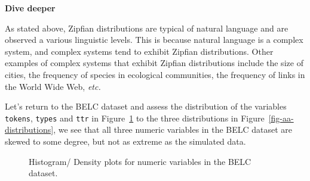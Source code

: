 \documentclass[
  letterpaper,
  DIV=11,
  numbers=noendperiod]{scrreprt}
\theoremstyle{definition}
\theoremstyle{remark}
\begin{document}
\begin{tcolorbox}[enhanced jigsaw, leftrule=.75mm, colframe=quarto-callout-color-frame, colback=white, rightrule=.15mm, opacityback=0, arc=.35mm, breakable, bottomrule=.15mm, left=2mm, toprule=.15mm]

\textbf{ Dive deeper}

As stated above, Zipfian distributions are typical of natural language
and are observed a various linguistic levels. This is because natural
language is a complex system, and complex systems tend to exhibit
Zipfian distributions. Other examples of complex systems that exhibit
Zipfian distributions include the size of cities, the frequency of
species in ecological communities, the frequency of links in the World
Wide Web, \emph{etc.}

\end{tcolorbox}

Let's return to the BELC dataset and assess the distribution of the
variables \texttt{tokens}, \texttt{types} and \texttt{ttr} in
Figure~\ref{fig-aa-belc-histogram-density-trimmed} to the three
distributions in Figure~\ref{fig-aa-distributions}, we see that all
three numeric variables in the BELC dataset are skewed to some degree,
but not as extreme as the simulated data.

\begin{figure}[H]

\begin{minipage}{0.33\linewidth}



\end{minipage}%
%
\begin{minipage}{0.33\linewidth}



\end{minipage}%
%
\begin{minipage}{0.33\linewidth}



\end{minipage}%

\caption{\label{fig-aa-belc-histogram-density-trimmed}Histogram/ Density
plots for numeric variables in the BELC dataset.}

\end{figure}%
\end{document}
